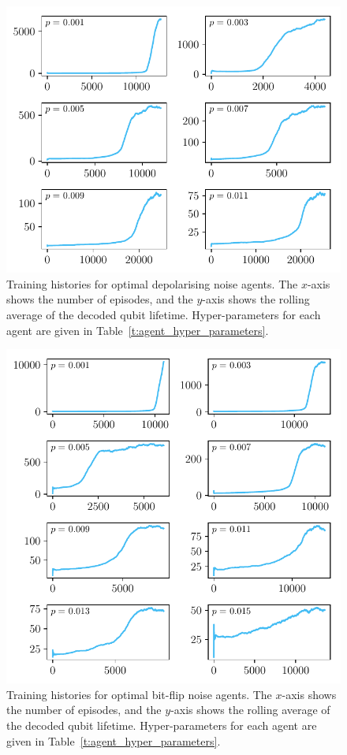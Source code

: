 \documentclass[twocolumn,preprintnumbers,amsmath,amssymb,notitlepage,nofootinbib,longbibliography,superscriptaddress,aps,pra,10pt]{revtex4-1}
\begin{document}
	\begin{figure}
		\centering
		\includegraphics[width=\linewidth]{figures/depolarising_histories.pdf}
		\caption{
			Training histories for optimal depolarising noise agents.
			The $x$-axis shows the number of episodes, and the $y$-axis shows the rolling average of the decoded qubit lifetime.
			Hyper-parameters for each agent are given in Table~\ref{t:agent_hyper_parameters}.
		}
		\label{f:training_results_dp}
	\end{figure}

	\begin{figure}
		\centering{}
		\includegraphics[width=\linewidth]{figures/bitflip_histories.pdf}
		\caption{
			Training histories for optimal bit-flip noise agents.
			The $x$-axis shows the number of episodes, and the $y$-axis shows the rolling average of the decoded qubit lifetime.
			Hyper-parameters for each agent are given in Table~\ref{t:agent_hyper_parameters}.
		}
		\label{f:training_results_x}
	\end{figure}

	\clearpage
	
	
\end{document}
